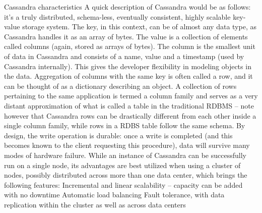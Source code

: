 Cassandra characteristics
A quick description of Cassandra would be as follows: it’s a truly distributed, schema-less, eventually consistent, highly scalable key-value storage system.
The key, in this context, can be of almost any data type, as Cassandra handles it as an array of bytes. The value is a collection of elements called columns (again, stored as arrays of bytes). The column is the smallest unit of data in Cassandra and consists of a name, value and a timestamp (used by Cassandra internally). This gives the developer flexibility in modeling objects in the data. Aggregation of columns with the same key is often called a row, and it can be thought of as a dictionary describing an object. A collection of rows pertaining to the same application is termed a column family and serves as a very distant approximation of what is called a table in the traditional RDBMS – note however that Cassandra rows can be drastically different from each other inside a single column family, while rows in a RDBS table follow the same schema.
 By design, the write operation is durable: once a write is completed (and this becomes known to the client requesting this procedure), data will survive many modes of hardware failure. While an instance of Cassandra can be successfully run on a single node, its advantages are best utilized when using a cluster of nodes, possibly distributed across more than one data center, which brings the following features:
Incremental and linear scalability – capacity can be added with no downtime
Automatic load balancing
Fault tolerance, with data replication within the cluster as well as across data centers


